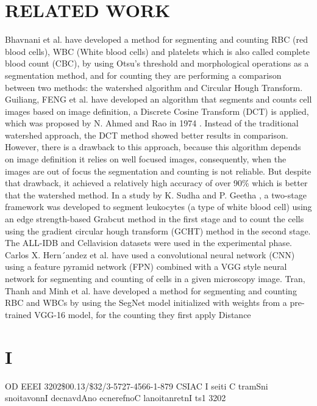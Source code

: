 \documentclass[conference]{IEEEtran}
\begin{document}
\section{RELATED WORK}
Bhavnani et al. \cite{ref2} have developed a method for segmenting and counting RBC (red blood cells), WBC (White blood cells) and platelets which is also called complete blood count (CBC), by using Otsu’s threshold and morphological operations as a segmentation method, and for counting they are performing a comparison between two methods: the watershed algorithm and Circular Hough Transform.
Guiliang, FENG et al. \cite{ref3} have developed an algorithm that segments and counts cell images based on image definition, a Discrete Cosine Transform (DCT) is applied, which was proposed by N. Ahmed and Rao in 1974 \cite{ref4}. Instead of the traditional watershed approach, the DCT method showed better results in comparison. However, there is a drawback to this approach, because this algorithm depends on image definition it relies on well focused images, consequently, when the images are out of focus the segmentation and counting is not reliable. But despite that drawback, it achieved a relatively high accuracy of over 90\% which is better that the watershed method. In a study by K. Sudha and P. Geetha \cite{ref5}, a two-stage framework was developed to segment leukocytes (a type of white blood cell) using an edge strength-based Grabcut method in the first stage and to count the cells using the gradient circular hough transform (GCHT) method in the second stage. The ALL-IDB \cite{ref6} and Cellavision \cite{ref7} datasets were used in the experimental phase.
Carlos X. Hern´andez et al. \cite{ref8} have used a convolutional neural network (CNN) using a feature pyramid network (FPN) combined with a VGG style neural network for segmenting and counting of cells in a given microscopy image.
Tran, Thanh and Minh et al. \cite{ref9} have developed a method for segmenting and counting RBC and WBCs by using the SegNet model initialized with weights from a pre-trained VGG-16 model, for the counting they first apply Distance

\section{I}
OD
\hline
EEEI
3202\$00.13/\$32/3-5727-4566-1-879
\hline
CSIAC
I
seiti
C
tramSni
snoitavonnI
decnavdAno
ecnerefnoC
lanoitanretnI
ts1
3202
\end{document}
